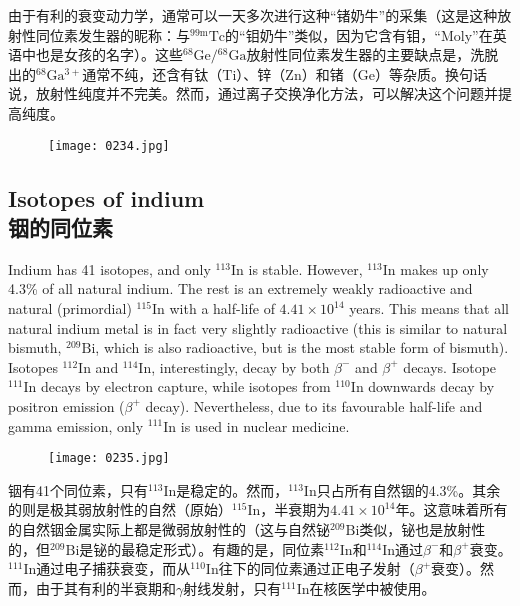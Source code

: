\documentclass[dvipsnames, svgnames,a4paper,11pt]{article}
\begin{document}
由于有利的衰变动力学，通常可以一天多次进行这种“锗奶牛”的采集（这是这种放射性同位素发生器的昵称：与\(\mathrm{^{99m}Tc}\)的“钼奶牛”类似，因为它含有钼，“Moly”在英语中也是女孩的名字）。这些\(\mathrm{^{68}Ge}/\mathrm{^{68}Ga}\)放射性同位素发生器的主要缺点是，洗脱出的\(\mathrm{^{68}Ga^{3+}}\)通常不纯，还含有钛（\(\mathrm{Ti}\)）、锌（\(\mathrm{Zn}\)）和锗（\(\mathrm{Ge}\)）等杂质。换句话说，放射性纯度并不完美。然而，通过离子交换净化方法，可以解决这个问题并提高纯度。

\begin{figure}[h]
	\centering
    \texttt{[image: 0234.jpg]}  
     \label{fig311}
\end{figure}

\subsection{Isotopes of indium\\ 铟的同位素}  
Indium has 41 isotopes, and only \(\mathrm{^{113}In}\) is stable. However, \(\mathrm{^{113}In}\) makes up only 4.3\% of all natural indium. The rest is an extremely weakly radioactive and natural (primordial) \(\mathrm{^{115}In}\) with a half-life of \(4.41 \times 10^{14}\) years. This means that all natural indium metal is in fact very slightly radioactive (this is similar to natural bismuth, \(\mathrm{^{209}Bi}\), which is also radioactive, but is the most stable form of bismuth). Isotopes \(\mathrm{^{112}In}\) and \(\mathrm{^{114}In}\), interestingly, decay by both \(\beta^-\) and \(\beta^+\) decays. Isotope \(\mathrm{^{111}In}\) decays by electron capture, while isotopes from \(\mathrm{^{110}In}\) downwards decay by positron emission (\(\beta^+\) decay). Nevertheless, due to its favourable half-life and gamma emission, only \(\mathrm{^{111}In}\) is used in nuclear medicine.


\begin{figure}[h]
	\centering
    \texttt{[image: 0235.jpg]}  
     \label{fig312}
\end{figure}

铟有41个同位素，只有\(\mathrm{^{113}In}\)是稳定的。然而，\(\mathrm{^{113}In}\)只占所有自然铟的4.3\%。其余的则是极其弱放射性的自然（原始）\(\mathrm{^{115}In}\)，半衰期为\(4.41 \times 10^{14}\)年。这意味着所有的自然铟金属实际上都是微弱放射性的（这与自然铋\(\mathrm{^{209}Bi}\)类似，铋也是放射性的，但\(\mathrm{^{209}Bi}\)是铋的最稳定形式）。有趣的是，同位素\(\mathrm{^{112}In}\)和\(\mathrm{^{114}In}\)通过\(\beta^-\)和\(\beta^+\)衰变。 \(\mathrm{^{111}In}\)通过电子捕获衰变，而从\(\mathrm{^{110}In}\)往下的同位素通过正电子发射（\(\beta^+\)衰变）。然而，由于其有利的半衰期和$\gamma$射线发射，只有\(\mathrm{^{111}In}\)在核医学中被使用。
\end{document}
